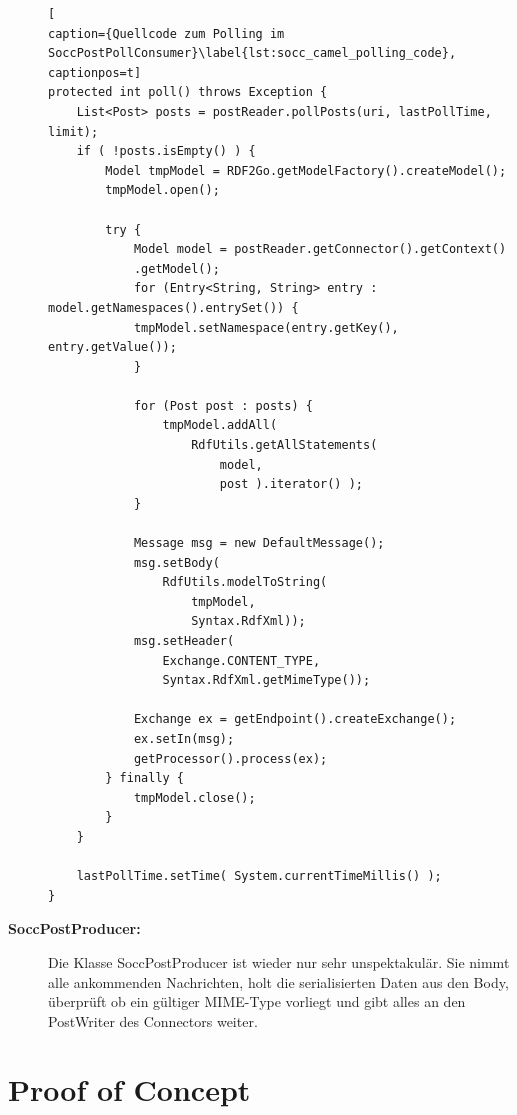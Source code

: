 \begin{description}
\begin{lstlisting}[
caption={Quellcode zum Polling im  SoccPostPollConsumer}\label{lst:socc_camel_polling_code},
captionpos=t]
protected int poll() throws Exception {
    List<Post> posts = postReader.pollPosts(uri, lastPollTime, limit);
    if ( !posts.isEmpty() ) {
        Model tmpModel = RDF2Go.getModelFactory().createModel();
        tmpModel.open();

        try {
            Model model = postReader.getConnector().getContext()
            .getModel();
            for (Entry<String, String> entry : model.getNamespaces().entrySet()) {
            tmpModel.setNamespace(entry.getKey(), entry.getValue());
            }

            for (Post post : posts) {
                tmpModel.addAll( 
                    RdfUtils.getAllStatements( 
                        model, 
                        post ).iterator() );
            }

            Message msg = new DefaultMessage();
            msg.setBody( 
                RdfUtils.modelToString(
                    tmpModel, 
                    Syntax.RdfXml));
            msg.setHeader(
                Exchange.CONTENT_TYPE, 
                Syntax.RdfXml.getMimeType());

            Exchange ex = getEndpoint().createExchange();
            ex.setIn(msg);
            getProcessor().process(ex);
        } finally {
            tmpModel.close();
        }
    }

    lastPollTime.setTime( System.currentTimeMillis() );
}
\end{lstlisting}

    \item[\textbf{SoccPostProducer:}] Die Klasse SoccPostProducer ist wieder nur sehr unspektakulär. Sie nimmt alle ankommenden Nachrichten, holt die serialisierten Daten aus den Body, überprüft ob ein gültiger MIME-Type vorliegt und gibt alles an den PostWriter des Connectors weiter. 
    
\end{description}



\section{Proof of Concept} %
\label{sec:proof_of_concept}

